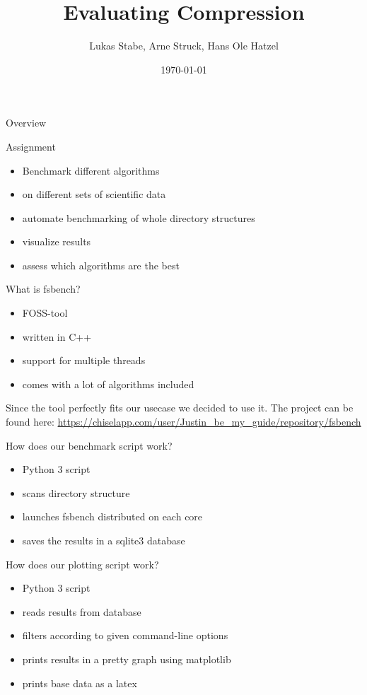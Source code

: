 \documentclass[10pt, compress]{beamer}
\title{Evaluating Compression}
\date{\today}
\author{Lukas Stabe, Arne Struck, Hans Ole Hatzel}
\begin{document}
\maketitle
\begin{frame}{Overview}
    \tableofcontents
\end{frame}


\begin{frame}{Assignment}
    
    \begin{itemize}
        \item Benchmark different algorithms
        \item on different sets of scientific data
        \item automate benchmarking of whole directory structures
        \item visualize results
        \item assess which algorithms are the best
    \end{itemize}
\end{frame}
\begin{frame}{What is fsbench?}
    \begin{itemize}
        \item FOSS-tool
        \item written in C++
        \item support for multiple threads
        \item comes with a lot of algorithms included
    \end{itemize}
    \vspace{1em}
    Since the tool perfectly fits our usecase we decided to use it.
    The project can be found here:    
    \url{https://chiselapp.com/user/Justin_be_my_guide/repository/fsbench}
\end{frame}
\begin{frame}{How does our benchmark script work?}
    \begin{itemize}
        \item Python 3 script
        \item scans directory structure
        \item launches fsbench distributed on each core
        \item saves the results in a sqlite3 database
    \end{itemize}    
\end{frame}

\begin{frame}{How does our plotting script work?}
    \begin{itemize}
        \item Python 3 script
        \item reads results from database
        \item filters according to given command-line options
        \item prints results in a pretty graph using matplotlib
        \item prints base data as a latex 
    \end{itemize}    
\end{frame}
\end{document}
